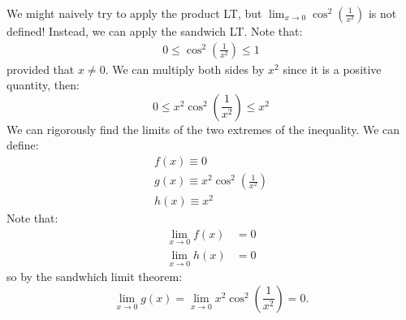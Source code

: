 \begin{itemize}
\begin{example}
        We might naively try to apply the product LT, but $\displaystyle \lim_{x\to 0}\cos^2\left(\frac{1}{x^2}\right)$ is not defined! Instead, we can apply the sandwich LT. Note that:
        \begin{align}
            0 \le \cos^2\left(\frac{1}{x^2}\right) \le 1
        \end{align}
        provided that $x\neq 0$. We can multiply both sides by $x^2$ since it is a positive quantity, then:
        \begin{equation}
            0 \le x^2\cos^2\left(\frac{1}{x^2}\right)\le x^2
            \label{eq:}
        \end{equation}
        We can rigorously find the limits of the two extremes of the inequality. We can define:
        \begin{align}
            f(x) \equiv 0 \\ 
            g(x) \equiv x^2\cos^2\left(\frac{1}{x^2}\right) \\ 
            h(x) \equiv x^2
        \end{align}
        Note that:
        \begin{align}
            \lim_{x\to 0}f(x)&=0 \\ 
            \lim_{x\to 0}h(x)&=0
            \label{eq:}
        \end{align}
        so by the sandwhich limit theorem:
        \begin{equation}
            \lim_{x\to 0} g(x) = \lim_{x\to 0} x^2\cos^2\left(\frac{1}{x^2}\right)=0.
            \label{eq:}
        \end{equation}
    \end{example}
\end{itemize}
